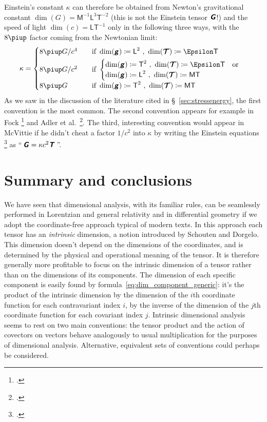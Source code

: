 \documentclass[\ifafour a4paper,12pt,\else a5paper,10pt,\fi%
onecolumn,oneside,article,%
british%
]{memoir}
\theoremstyle{remark}
\theoremstyle{innote}
\newcommand*{\mathte}[1]{\textbf{\textit{\textsf{#1}}}}
\newcommand*{\citep}{\footcites}
\newcommand*{\pu}{\piup}%
\newcommand*{\defd}{\coloneqq}
\renewcommand*{\|}[1][]{\nonscript\,#1\vert\nonscript\;\mathopen{}}
\newcommand*{\sect}{\S}%
\newcommand*{\eqn}{eq.}%
\newcommand*{\eqns}{eqs}%
\newcommand*{\etal}{{et al.}}
\newcommand*{\Le}{\textsf{L}}
\newcommand*{\Ti}{\textsf{T}}
\newcommand*{\Ma}{\textsf{M}}
\newcommand*{\En}{\Epsilon}%
\newcommand*{\yg}{\mathte{g}}
\newcommand*{\yT}{\bm{\mathcal{T}}}
\newcommand*{\yTe}{\mathte{T}}
\newcommand*{\yG}{\mathte{G}}
\newcommand*{\yk}{\kappa}
\begin{document}
Einstein's constant $\yk$ can therefore be obtained from Newton's
gravitational constant $\dim(G)=\Ma^{-1}\Le^{3}\Ti^{-2}$ (this is not the
Einstein tensor $\yG$!) and the speed of light $\dim(c)=\Le\Ti^{-1}$ only
in the following three ways, with the $8\pu$ factor coming from the
Newtonian limit:
\begin{equation}
\label{eq:dim_k_Gc}
\yk =
\begin{cases}
  8\pu G/c^{4} &\quad\text{if}\ \dim(\yg)\defd \Le^2 \ ,\ \dim(\yT)\defd \En\Ti
 \\[\jot]
  8\pu G/c^{2} &\quad\text{if}\ 
 \begin{cases}
\dim(\yg)\defd \Ti^2 \ ,\ \dim(\yT)\defd \En\Ti 
    \quad\text{or}\\
\dim(\yg)\defd \Le^2 \ ,\ \dim(\yT)\defd \Ma\Ti 
 \end{cases}
\\[2\jot]
  8\pu G  &\quad\text{if}\ 
\dim(\yg)\defd \Ti^2 \ ,\ \dim(\yT)\defd \Ma\Ti
  \end{cases}
\end{equation}
As we saw in the discussion of the literature cited in
\sect~\ref{sec:stressenergy}, the first convention is the most common. The
second convention appears for example in Fock \citep[\sect~55 \eqns~(55.15)
and~(52.06)]{fock1955_t1964} and Adler \etal\ \citep[\sect~10.5
\eqn~(10.98)]{adleretal1965_r1975}. The third, interesting convention would
appear in McVittie if he didn't cheat a factor $1/c^{2}$ into $\yk$ by
writing the Einstein equations \citep[\sect~4.2
\eqn~(4.107)]{mcvittie1956_r1965} as \enquote{\,$\yG = \yk c^{2} \yTe$\,}.



\section{Summary and conclusions}
\label{sec:summary}

We have seen that dimensional analysis, with its familiar rules, can be
seamlessly performed in Lorentzian and general relativity and in
differential geometry if we adopt the coordinate-free approach typical of
modern texts. In this approach each tensor has an \emph{intrinsic}
dimension, a notion introduced by Schouten and Dorgelo. This dimension
doesn't depend on the dimensions of the coordinates, and is determined by
the physical and operational meaning of the tensor. It is therefore
generally more profitable to focus on the intrinsic dimension of a tensor
rather than on the dimensions of its components. The dimension of each
specific component is easily found by
formula~\eqref{eq:dim_component_generic}: it's the product of the intrinsic
dimension by the dimension of the $i$th coordinate function for each
contravariant index $i$, by the inverse of the dimension of the $j$th
coordinate function for each covariant index $j$. Intrinsic dimensional
analysis seems to rest on two main conventions: the tensor product and the
action of covectors on vectors behave analogously to usual multiplication
for the purposes of dimensional analysis. Alternative, equivalent sets of
conventions could perhaps be considered.
\end{document}

